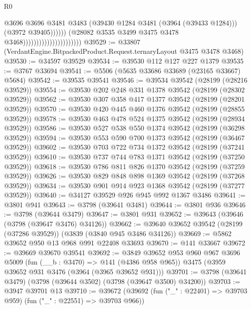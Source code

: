 \begin{lexlean}{R0}
\begin{coremodule}
                                                        @3696
                                                        @3696
                                                        @3481
                                                        @3483
                                                        (@39430 @1284 @3481 (@3964 (@39433 @1284)))
                                                        (@3972 @39405))))))
                                              (@28082
                                                @3535
                                                @3499
                                                @3475
                                                @3478
                                                @3468))))))))))))))))))))))
@39529 := @33807 (VerdantEngine.BitpackedProduct.Request.ternaryLayout @3475 @3478 @3468)
@39530 := @34597 @39529
@39534 := @39530 @112 @127 @227 @1379
@39535 := @3767 @33694
@39541 := @5506 (@5635 @33686 @33689 (@23165 @33667) @5684)
@39542 := @39535 @39541
@39546 := @39534 @39542 (@28199 (@28216 @39529))
@39554 := @39530 @202 @248 @331 @1378 @39542 (@28199 (@28302 @39529))
@39562 := @39530 @307 @358 @417 @1377 @39542 (@28199 (@28201 @39529))
@39570 := @39530 @420 @445 @460 @1376 @39542 (@28199 (@28855 @39529))
@39578 := @39530 @463 @478 @524 @1375 @39542 (@28199 (@28934 @39529))
@39586 := @39530 @527 @538 @550 @1374 @39542 (@28199 (@36298 @39529))
@39594 := @39530 @553 @590 @700 @1373 @39542 (@28199 (@36467 @39529))
@39602 := @39530 @703 @722 @734 @1372 @39542 (@28199 (@37241 @39529))
@39610 := @39530 @737 @744 @783 @1371 @39542 (@28199 (@37250 @39529))
@39618 := @39530 @786 @811 @826 @1370 @39542 (@28199 (@37259 @39529))
@39626 := @39530 @829 @848 @898 @1369 @39542 (@28199 (@37268 @39529))
@39634 := @39530 @901 @914 @923 @1368 @39542 (@28199 (@37277 @39529))
@39640 := @34127 @39529 @926 @945 @992 @1367 @3486
@39641 := @3801 @941
@39643 := @3798 (@39641 @3481)
@39644 := @3801 @936
@39646 := @3798 (@39644 @3479)
@39647 := @3801 @931
@39652 := @39643 (@39646 (@3798 (@39647 @3476) @34126))
@39662 := @39640 @39652 @39542 (@28199 (@37286 @39529)) (@3839 (@3840 @945 @3486 @34126))
@39669 := @5862 @39652 @950 @13 @968 @991 @22408 @33693
@39670 := @141 @33667
@39672 := @39669 @39670 @39541
@39692 := @3849
    @39652
    @953
    @960
    @967
    @3696
    @5009
    (fun (__b : @3470) => @141 (@4386 @958 @965))
    @3475
    (@3959 @39652 @931 @3476 (@3964 (@3965 @39652 @931)))
@39701 := @3798 (@39641 @3479) (@3798 (@39644 @3502) (@3798 (@39647 @3500) @34200))
@39703 := @3947 @39701 @13
@39710 := @39672 (@39692 (fun ("_" : @22401) => @39703 @959) (fun ("_" : @22551) => @39703 @966))

\end{coremodule}
\end{lexlean}
